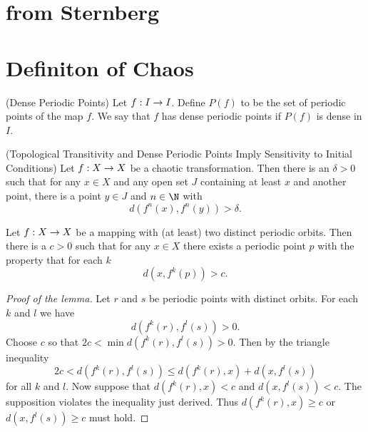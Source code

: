 \documentclass[11pt]{book}
\begin{document}
\section{from Sternberg}

\section{Definiton of Chaos}
\begin{definition}
  (Dense Periodic Points) Let $f: I \rightarrow I$. Define $P(f)$ to be the set of periodic points
  of the map $f$. We say that $f$ has dense periodic points if $P(f)$ is
  dense in $I$.
\end{definition}

\begin{proposition}
  (Topological Transitivity and Dense Periodic Points Imply Sensitivity to Initial Conditions)
  Let $f: X\rightarrow X$ be a chaotic transformation. Then there is an $\delta > 0$ such that
  for any $x\in X$ and any open set $J$ containing at least $x$ and another point, there is
  a point $y\in J$ and $n\in \N$ with
  \begin{equation*}
    d(f^n(x),f^n(y)) > \delta.
  \end{equation*}
  \label{thm:sensitivity}
\end{proposition}
\begin{lemma}
  Let $f: X\rightarrow X$ be a mapping with (at least) two distinct periodic orbits.
  Then there is a $c > 0$ such that for any $x\in X$ there exists a periodic
  point $p$ with the property that for each $k$
  \begin{equation*}
    d(x, f^k(p)) > c.
  \end{equation*}
\end{lemma}
\begin{proof}[Proof of the lemma]
  Let $r$ and $s$ be periodic points with distinct orbits. For each $k$ and $l$ we have
  \begin{equation*}
    d(f^k(r), f^l(s)) > 0.
  \end{equation*}
  Choose $c$ so that $2c < \min d(f^k(r),f^l(s)) > 0$. Then by the triangle inequality
  \begin{equation*}
    2c < d(f^k(r),f^l(s)) \leq d(f^k(r),x) + d(x,f^l(s))
  \end{equation*}
  for all $k$ and $l$. Now suppose that $d(f^k(r),x)<c$ and $d(x,f^l(s))<c$. The supposition
  violates the inequality just derived. Thus $d(f^k(r),x) \geq c$ or $d(x,f^l(s)) \geq c$ must hold.
\end{proof}
\end{document}
